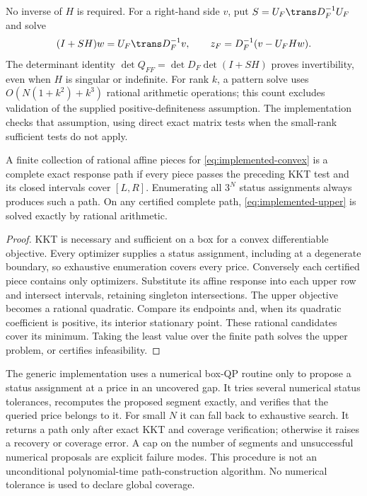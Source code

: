 No inverse of $H$ is required. For a right-hand side $v$, put
$S=U_F\trans D_F^{-1}U_F$ and solve
\[
 (I+SH)w=U_F\trans D_F^{-1}v,
 \qquad z_F=D_F^{-1}(v-U_FHw).
\]
The determinant identity
$\det Q_{FF}=\det D_F\det(I+SH)$ proves invertibility, even when $H$ is singular
or indefinite. For rank $k$, a pattern solve uses
$O(N(1+k^2)+k^3)$ rational arithmetic operations; this count excludes validation
of the supplied positive-definiteness assumption. The implementation checks
that assumption, using direct exact matrix tests when the small-rank sufficient
tests do not apply.

\begin{proposition}
\label{prop:convex-certified-path}
A finite collection of rational affine pieces for \eqref{eq:implemented-convex}
is a complete exact response path if every piece passes the preceding KKT test
and its closed intervals cover $[L,R]$. Enumerating all $3^N$ status assignments
always produces such a path. On any certified complete path,
\eqref{eq:implemented-upper} is solved exactly by rational arithmetic.
\end{proposition}
\begin{proof}
KKT is necessary and sufficient on a box for a convex differentiable objective.
Every optimizer supplies a status assignment, including at a degenerate
boundary, so exhaustive enumeration covers every price. Conversely each
certified piece contains only optimizers. Substitute its affine response into
each upper row and intersect intervals, retaining singleton intersections.
The upper objective becomes a rational quadratic. Compare its endpoints and,
when its quadratic coefficient is positive, its interior stationary point.
These rational candidates cover its minimum. Taking the least value over the
finite path solves the upper problem, or certifies infeasibility.
\end{proof}

The generic implementation uses a numerical box-QP routine only to propose a
status assignment at a price in an uncovered gap. It tries several numerical
status tolerances, recomputes the proposed segment exactly, and verifies that
the queried price belongs to it. For small $N$ it can fall back to exhaustive
search. It returns a path only after exact KKT and coverage verification;
otherwise it raises a recovery or coverage error. A cap on the number of
segments and unsuccessful numerical proposals are explicit failure modes.
This procedure is not an unconditional polynomial-time path-construction
algorithm. No numerical tolerance is used to declare global coverage.

